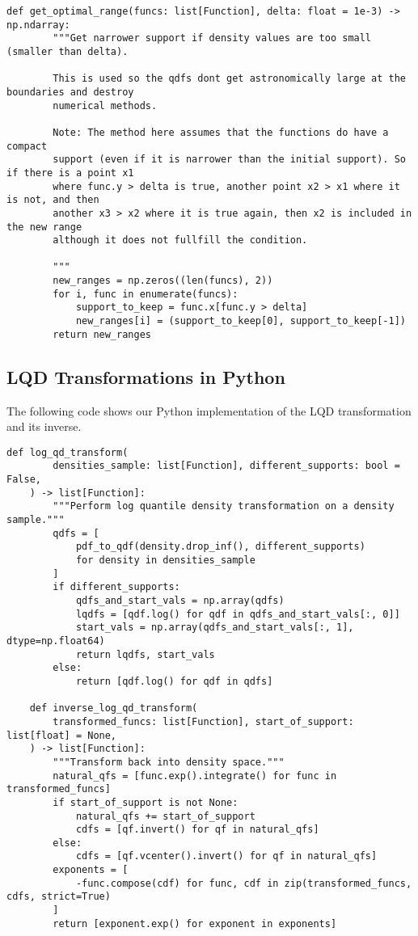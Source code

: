 \begin{lstlisting}[style=python]
    def get_optimal_range(funcs: list[Function], delta: float = 1e-3) -> np.ndarray:
        """Get narrower support if density values are too small (smaller than delta).

        This is used so the qdfs dont get astronomically large at the boundaries and destroy
        numerical methods.

        Note: The method here assumes that the functions do have a compact
        support (even if it is narrower than the initial support). So if there is a point x1
        where func.y > delta is true, another point x2 > x1 where it is not, and then
        another x3 > x2 where it is true again, then x2 is included in the new range
        although it does not fullfill the condition.

        """
        new_ranges = np.zeros((len(funcs), 2))
        for i, func in enumerate(funcs):
            support_to_keep = func.x[func.y > delta]
            new_ranges[i] = (support_to_keep[0], support_to_keep[-1])
        return new_ranges
\end{lstlisting}

\subsection{LQD Transformations in Python}
\label{sec:code_lqd}
The following code shows our Python implementation of the LQD transformation and its
inverse.
\begin{lstlisting}[style=python]
    def log_qd_transform(
        densities_sample: list[Function], different_supports: bool = False,
    ) -> list[Function]:
        """Perform log quantile density transformation on a density sample."""
        qdfs = [
            pdf_to_qdf(density.drop_inf(), different_supports)
            for density in densities_sample
        ]
        if different_supports:
            qdfs_and_start_vals = np.array(qdfs)
            lqdfs = [qdf.log() for qdf in qdfs_and_start_vals[:, 0]]
            start_vals = np.array(qdfs_and_start_vals[:, 1], dtype=np.float64)
            return lqdfs, start_vals
        else:
            return [qdf.log() for qdf in qdfs]

    def inverse_log_qd_transform(
        transformed_funcs: list[Function], start_of_support: list[float] = None,
    ) -> list[Function]:
        """Transform back into density space."""
        natural_qfs = [func.exp().integrate() for func in transformed_funcs]
        if start_of_support is not None:
            natural_qfs += start_of_support
            cdfs = [qf.invert() for qf in natural_qfs]
        else:
            cdfs = [qf.vcenter().invert() for qf in natural_qfs]
        exponents = [
            -func.compose(cdf) for func, cdf in zip(transformed_funcs, cdfs, strict=True)
        ]
        return [exponent.exp() for exponent in exponents]
\end{lstlisting}

